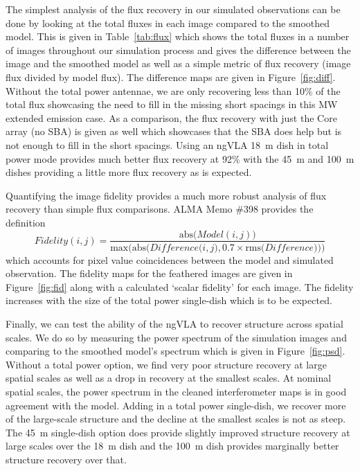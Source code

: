 \documentclass[12pt]{article}
\begin{document}
The simplest analysis of the flux recovery in our simulated observations can be done by looking at the total fluxes in each image compared to the smoothed model. This is given in Table~\ref{tab:flux} which shows the total fluxes in a number of images throughout our simulation process and gives the difference between the image and the smoothed model as well as a simple metric of flux recovery (image flux divided by model flux). The difference maps are given in Figure~\ref{fig:diff}. Without the total power antennae, we are only recovering less than 10\% of the total flux showcasing the need to fill in the missing short spacings in this MW extended emission case. As a comparison, the flux recovery with just the Core array (no SBA) is given as well which showcases that the SBA does help but is not enough to fill in the short spacings. Using an ngVLA \SI{18}{\meter} dish in total power mode provides much better flux recovery at 92\% with the \SI{45}{\meter} and \SI{100}{\meter} dishes providing a little more flux recovery as is expected. 

Quantifying the image fidelity provides a much more robust analysis of flux recovery than simple flux comparisons. ALMA Memo \#398 provides the definition 
\begin{equation}
\textit{Fidelity}(i,j) = \frac{\text{abs(}\textit{Model}(i,j))}{\text{max(abs(}\textit{Difference(}i,j), 0.7 \times \text{rms(}\textit{Difference})))}
\end{equation}
which accounts for pixel value coincidences between the model and simulated observation. The fidelity maps for the feathered images are given in Figure~\ref{fig:fid} along with a calculated `scalar fidelity' for each image. The fidelity increases with the size of the total power single-dish which is to be expected. 

Finally, we can test the ability of the ngVLA to recover structure across spatial scales. We do so by measuring the power spectrum of the simulation images and comparing to the smoothed model's spectrum which is given in Figure~\ref{fig:psd}. Without a total power option, we find very poor structure recovery at large spatial scales as well as a drop in recovery at the smallest scales. At nominal spatial scales, the power spectrum in the cleaned interferometer maps is in good agreement with the model. Adding in a total power single-dish, we recover more of the large-scale structure and the decline at the smallest scales is not as steep. The \SI{45}{\meter} single-dish option does provide slightly improved structure recovery at large scales over the \SI{18}{\meter} dish and the \SI{100}{\meter} dish provides marginally better structure recovery over that.
\end{document}
